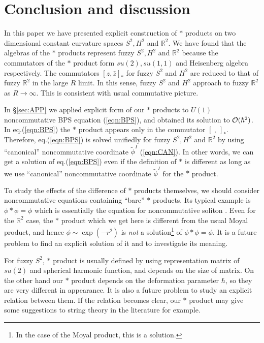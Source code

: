 \documentclass[12pt,a4paper]{article}
\def\h{\hbar}
\begin{document}
\section{Conclusion and discussion}

In this paper we have presented explicit construction of $*$
products on two dimensional constant curvature spaces $S^2,H^2$ and ${\mathbb
  R}^2$.
We have found that the algebras of the $*$ products represent fuzzy 
$S^2,H^2$ and ${\mathbb R}^2$ because the commutators of the $*$ product form
$su(2),su(1,1)$ and Heisenberg algebra respectively.  
The commutators $[z,{\bar z}]_*$ for fuzzy 
$S^2$ and $H^2$ are reduced to that of fuzzy ${\mathbb R}^2$ in the large $R$
limit.
In this sense, fuzzy $S^2$ and $H^2$ approach to fuzzy ${\mathbb
  R}^2$ as $R\to\infty$.
This is consistent with usual commutative picture.

In \S \ref{sec:APP} we applied explicit form of our $*$ products to $U(1)$
noncommutative BPS equation (\ref{eqn:BPS}), and obtained its solution
to ${\cal O}(\h^2)$. 
In eq.(\ref{eqn:BPS}) the $*$ product appears only in the commutator $[\ ,\
]_*$. Therefore, eq.(\ref{eqn:BPS}) is solved unifiedly for
fuzzy $S^2,H^2$ and ${\mathbb R}^2$ by using ``canonical'' noncommutative
coordinate ${\tilde \phi}^I$ (\ref{eqn:CAN}). In other words, we can
get a solution of eq.(\ref{eqn:BPS}) even if the definition of $*$ is
different as long as we use ``canonical'' noncommutative coordinate
${\tilde \phi}^I$ for the $*$ product.

To study the effects of the difference of $*$ products themselves, we
should consider noncommutative equations containing ``bare'' $*$
products.
Its typical example is $\phi*\phi=\phi$ which is essentially the equation
for noncommutative soliton \cite{GMS}. Even for the ${\mathbb R}^2$ case,
the $*$ product which we get here is different from the usual Moyal product,
and hence $\phi\sim\exp(- r^2)$ is {\it not} a solution\footnote{
In the case of the Moyal product, this is a solution.
} of  $\phi*\phi=\phi$.
It is a future problem to find an explicit solution of it and to
investigate its meaning.

For fuzzy $S^2$, $*$ product is usually defined by using
representation matrix of $su(2)$ and spherical harmonic function,
and depends on the size of matrix. On the other hand our $*$ product
depends on the deformation parameter $\h$, so they
are very different in appearance.
It is also a future problem to study an explicit relation between them.
If the relation becomes clear, our $*$ product may give some
suggestions to string theory in the literature \cite{SHOME} for example.
\end{document}
